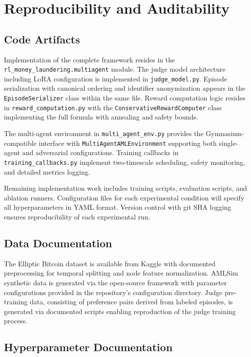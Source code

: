 \documentclass[11pt,a4paper]{article}
\begin{document}
\section{Reproducibility and Auditability}

\subsection{Code Artifacts}

Implementation of the complete framework resides in the \texttt{rl\_money\_laundering.multiagent} module. The judge model architecture including LoRA configuration is implemented in \texttt{judge\_model.py}. Episode serialization with canonical ordering and identifier anonymization appears in the \texttt{EpisodeSerializer} class within the same file. Reward computation logic resides in \texttt{reward\_computation.py} with the \texttt{ConservativeRewardComputer} class implementing the full formula with annealing and safety bounds.

The multi-agent environment in \texttt{multi\_agent\_env.py} provides the Gymnasium-compatible interface with \texttt{MultiAgentAMLEnvironment} supporting both single-agent and adversarial configurations. Training callbacks in \texttt{training\_callbacks.py} implement two-timescale scheduling, safety monitoring, and detailed metrics logging.

Remaining implementation work includes training scripts, evaluation scripts, and ablation runners. Configuration files for each experimental condition will specify all hyperparameters in YAML format. Version control with git SHA logging ensures reproducibility of each experimental run.

\subsection{Data Documentation}

The Elliptic Bitcoin dataset is available from Kaggle with documented preprocessing for temporal splitting and node feature normalization. AMLSim synthetic data is generated via the open-source framework with parameter configurations provided in the repository's configuration directory. Judge pre-training data, consisting of preference pairs derived from labeled episodes, is generated via documented scripts enabling reproduction of the judge training process.

\subsection{Hyperparameter Documentation}
\end{document}
